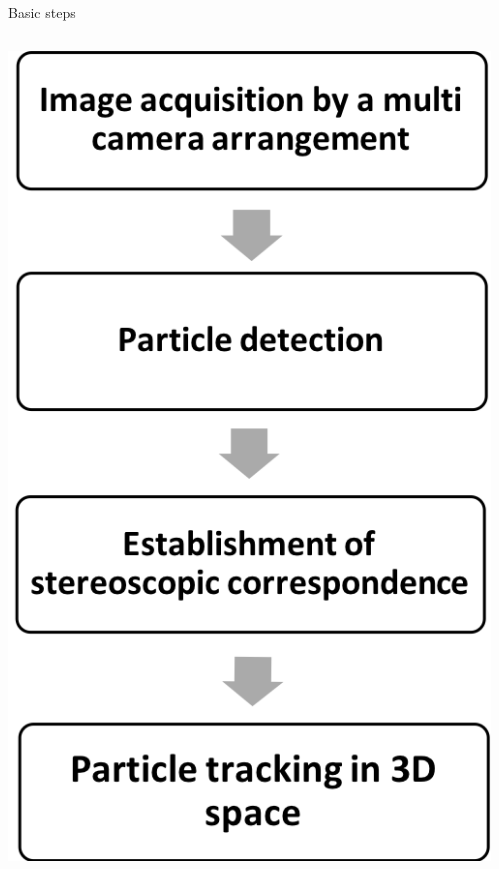 \documentclass[aspectratio=43]{beamer}
\begin{document}
%
\begin{frame}{Basic steps}
\begin{columns}[t]
	\begin{column}{0.4\textwidth}
		\includegraphics[height=.8\textheight]{ptv_blocks}
	\end{column}
	\begin{column}{0.3\textwidth}

\end{column}
\end{columns}
\end{frame}
\end{document}
